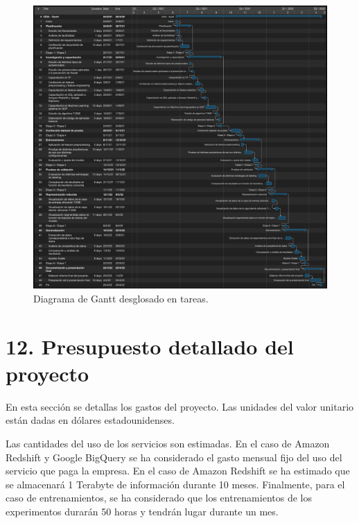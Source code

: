 \documentclass[
11pt, %
]{charter}
\begin{document}
\begin{figure}[htpb]
\centering 
\includegraphics[width=\textwidth,  height=0.9\textheight]{./Figuras/ganttCompleto.pdf}
\caption{Diagrama de Gantt desglosado en tareas.}
\label{fig:ganttCompleto}
\end{figure}

\section{12. Presupuesto detallado del proyecto}
\label{sec:presupuesto}

En esta sección se detallas los gastos del proyecto. Las unidades del valor unitario están dadas en dólares estadounidenses.

Las cantidades del uso de los servicios son estimadas. En el caso de Amazon Redshift y Google BigQuery se ha considerado el gasto mensual fijo del uso del servicio que paga la empresa. En el caso de Amazon Redshift se ha estimado que se almacenará 1 Terabyte de información durante 10 meses. Finalmente, para el caso de entrenamientos, se ha considerado que los entrenamientos de los experimentos durarán 50 horas y tendrán lugar durante un mes.
\end{document}
